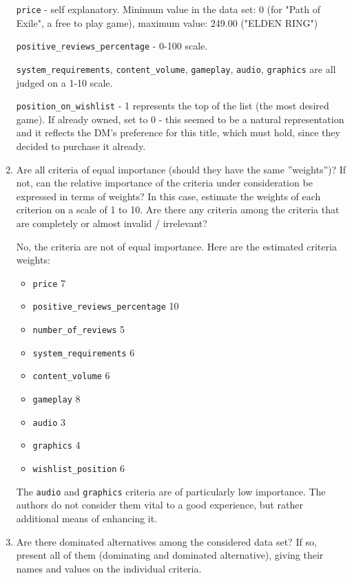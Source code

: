 \documentclass{article}
\begin{document}
\begin{enumerate}
    \verb|price| - self explanatory. Minimum value in the data set: 0 (for "Path of Exile", a free to play game), maximum value: 249.00 ("ELDEN RING")

    \verb|positive_reviews_percentage| - 0-100 scale.

    \verb|system_requirements|, \verb|content_volume|, \verb|gameplay|, \verb|audio|, \verb|graphics| are all judged on a 1-10 scale.

    \verb|position_on_wishlist| - 1 represents the top of the list (the most desired game). If already owned, set to 0 - this seemed to be a natural representation and it reflects the DM's preference for this title, which must hold, since they decided to purchase it already.


    \item Are all criteria of equal importance (should they have the same ”weights”)? If not, can the relative
    importance of the criteria under consideration be expressed in terms of weights? In this case, estimate
    the weights of each criterion on a scale of 1 to 10. Are there any criteria among the criteria that are
    completely or almost invalid / irrelevant?

    No, the criteria are not of equal importance. Here are the estimated criteria weights:
    \begin{itemize}
        \item \verb|price| 7
        \item \verb|positive_reviews_percentage| 10
        \item \verb|number_of_reviews| 5
        \item \verb|system_requirements| 6
        \item \verb|content_volume| 6
        \item \verb|gameplay| 8
        \item \verb|audio| 3
        \item \verb|graphics| 4
        \item \verb|wishlist_position| 6
    \end{itemize}

    The \verb|audio| and \verb|graphics| criteria are of particularly low importance. The authors do not consider them vital to a good experience, but rather additional means of enhancing it.

    \item Are there dominated alternatives among the considered data set? If so, present all of them (dominating
    and dominated alternative), giving their names and values on the individual criteria.


\end{enumerate}
\end{document}
